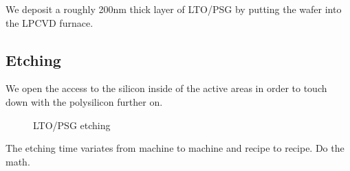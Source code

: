 We deposit a roughly 200nm thick layer of LTO/PSG by putting the wafer into the LPCVD furnace.

\subsection{Etching}\label{fox_etch}

We open the access to the silicon inside of the active areas in order to touch down with the polysilicon further on.

\begin{figure}[H]
	\centering
	\begin{tikzpicture}[node distance = 3cm, auto, thick,scale=\CrossSectionOnly, every node/.style={transform shape}]
		
	\end{tikzpicture}
	\drawStepArrow{}
	\begin{tikzpicture}[node distance = 3cm, auto, thick,scale=\CrossSectionOnly, every node/.style={transform shape}]
		
	\end{tikzpicture}
	\caption{LTO/PSG etching}
\end{figure}

The etching time variates from machine to machine and recipe to recipe. Do the math.
